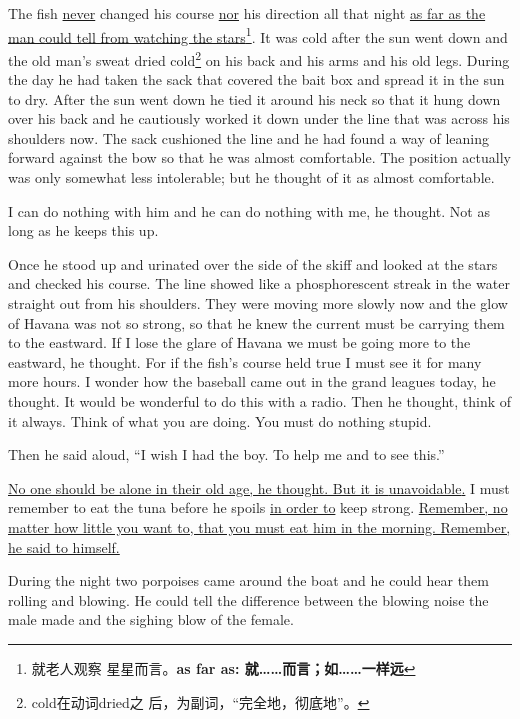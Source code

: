 The fish \uline{never} changed his \gls{course} \uline{nor} his direction all that night
\uline{as far as the man could tell from watching the stars}\footnote{就老人观察
  星星而言。\textbf{as far as: 就……而言；如……一样远}}. It was cold after the sun
went down and the old man's sweat dried cold\footnote{cold在动词dried之
  后，为副词，“完全地，彻底地”。} on his back and his arms and his old
legs. During the day he had taken the sack that covered the bait box and
spread it in the sun to dry. After the sun went down he tied it around his
neck so that it hung down over his back and he \gls{cautiously} worked it
down under the line that was across his shoulders now. The sack
\gls{cushioned} the line and he had found a way of leaning forward against
the bow so that he was almost \gls{comfortable}. The position actually was only
\gls{somewhat} less \gls{intolerable}; but he thought of it as almost comfortable.

I can do nothing with him and he can do nothing with me, he thought. Not as
long as he keeps this up.

Once he stood up and urinated over the side of the skiff and looked at
the stars and checked his course. The line showed like a
\gls{phosphorescent} \gls{streak} in the water straight out from his
shoulders. They were moving more slowly now and the glow of Havana was not
so strong, so that he knew the current must be carrying them to the
\gls{eastward}. If I lose the glare of Havana we must be going more to the
eastward, he thought. For if the fish's course held true I must see it for
many more hours. I wonder how the baseball came out in the grand leagues
today, he thought. It would be wonderful to do this with a radio. Then he
thought, think of it always. Think of what you are doing. You must do
nothing stupid.

Then he said aloud, ``I wish I had the boy. To help me and to see this.''

\uline{No one should be alone in their old age, he thought. But it is
\gls{unavoidable}.} I must remember to eat the tuna before he \glspl{spoil}
\uline{in order to} keep strong. \uline{Remember, no matter how little you want to,
that you must eat him in the morning. Remember, he said to himself.}

During the night two \glspl{porpoise} came around the boat and he could hear
them \gls{rolling} and \gls{blowing}. He could tell the difference between
the blowing noise the \gls{male} made and the \gls{sighing} blow of the
\gls{female}.

